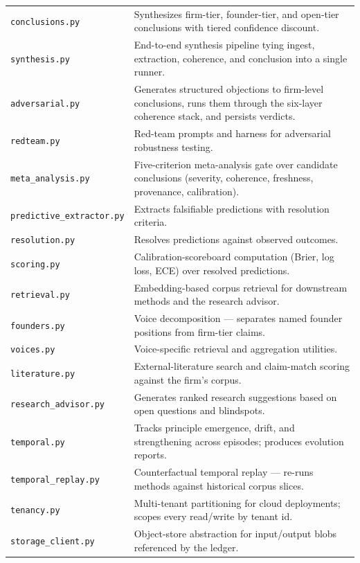 \documentclass[11pt,letterpaper]{article}
\newcommand{\mod}[1]{\texttt{#1}}
\begin{document}
\begin{longtable}{p{3.5cm} p{11cm}}
\mod{conclusions.py}        & Synthesizes firm-tier, founder-tier, and open-tier conclusions with tiered confidence discount. \\
\mod{synthesis.py}          & End-to-end synthesis pipeline tying ingest, extraction, coherence, and conclusion into a single runner. \\
\mod{adversarial.py}        & Generates structured objections to firm-level conclusions, runs them through the six-layer coherence stack, and persists verdicts. \\
\mod{redteam.py}            & Red-team prompts and harness for adversarial robustness testing. \\
\mod{meta\_analysis.py}     & Five-criterion meta-analysis gate over candidate conclusions (severity, coherence, freshness, provenance, calibration). \\
\mod{predictive\_extractor.py} & Extracts falsifiable predictions with resolution criteria. \\
\mod{resolution.py}         & Resolves predictions against observed outcomes. \\
\mod{scoring.py}            & Calibration-scoreboard computation (Brier, log loss, ECE) over resolved predictions. \\
\mod{retrieval.py}          & Embedding-based corpus retrieval for downstream methods and the research advisor. \\
\mod{founders.py}           & Voice decomposition --- separates named founder positions from firm-tier claims. \\
\mod{voices.py}             & Voice-specific retrieval and aggregation utilities. \\
\mod{literature.py}         & External-literature search and claim-match scoring against the firm's corpus. \\
\mod{research\_advisor.py}  & Generates ranked research suggestions based on open questions and blindspots. \\
\mod{temporal.py}           & Tracks principle emergence, drift, and strengthening across episodes; produces evolution reports. \\
\mod{temporal\_replay.py}   & Counterfactual temporal replay --- re-runs methods against historical corpus slices. \\
\mod{tenancy.py}            & Multi-tenant partitioning for cloud deployments; scopes every read/write by tenant id. \\
\mod{storage\_client.py}    & Object-store abstraction for input/output blobs referenced by the ledger. \\

\end{longtable}
\end{document}
